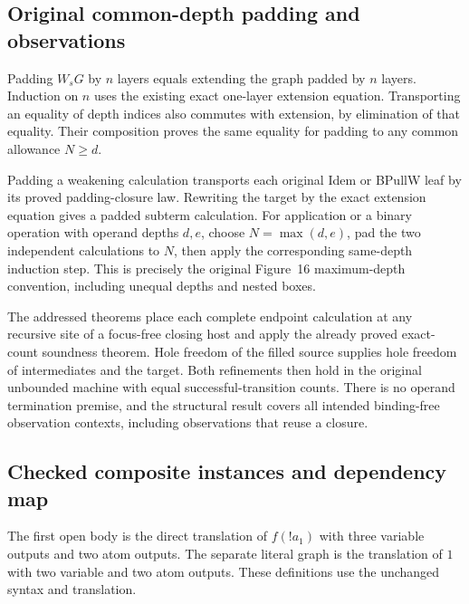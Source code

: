 \subsection{Original common-depth padding and observations}
Padding $W_sG$ by $n$ layers equals extending the graph padded by $n$ layers.
Induction on $n$ uses the existing exact one-layer extension equation.
Transporting an equality of depth indices also commutes with extension,
by elimination of that equality. Their composition proves the same equality
for padding to any common allowance $N\geq d$.

Padding a weakening calculation transports each original Idem or BPullW
leaf by its proved padding-closure law. Rewriting the target by the exact
extension equation gives a padded subterm calculation. For application or
a binary operation with operand depths $d,e$, choose $N=\max(d,e)$, pad
the two independent calculations to $N$, then apply the corresponding
same-depth induction step. This is precisely the original Figure~16
maximum-depth convention, including unequal depths and nested boxes.

The addressed theorems place each complete endpoint calculation at any
recursive site of a focus-free closing host and apply the already proved
exact-count soundness theorem. Hole freedom of the filled source supplies
hole freedom of intermediates and the target. Both refinements then hold
in the original unbounded machine with equal successful-transition counts.
There is no operand termination premise, and the structural result covers
all intended binding-free observation contexts, including observations
that reuse a closure.

\subsection{Checked composite instances and dependency map}
The first open body is the direct translation of $f(!a_1)$ with three
variable outputs and two atom outputs. The separate literal graph is the
translation of $1$ with two variable and two atom outputs. These definitions
use the unchanged syntax and translation.

